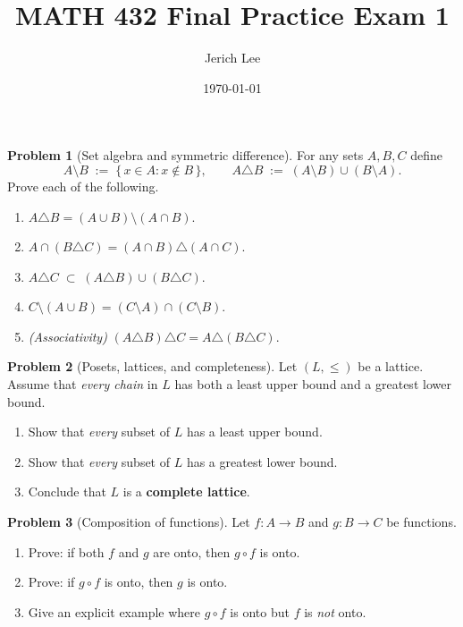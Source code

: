 \documentclass[12pt]{article}
\title{MATH 432 Final Practice Exam 1}
\author{Jerich Lee}
\date{\today}
\theoremstyle{definition} %
\newtheorem{problem}{Problem}
\theoremstyle{plain} %
\begin{document}
\maketitle



\begin{problem}[Set algebra and symmetric difference]
  For any sets $A,B,C$ define
  \[
      A\setminus B \;:=\; \{\,x\in A : x\notin B\,\},
      \qquad
      A\triangle B \;:=\;(A\setminus B)\cup(B\setminus A).
  \]
  Prove each of the following.
  \begin{enumerate}[label=(\alph*)]
    \item $A\triangle B=(A\cup B)\setminus(A\cap B)$.
    \item $A\cap(B\triangle C)=(A\cap B)\triangle(A\cap C)$.
    \item $A\triangle C\;\subset\;(A\triangle B)\cup(B\triangle C)$.
    \item $C\setminus(A\cup B)=(C\setminus A)\cap(C\setminus B)$.
    \item \emph{(Associativity)}\;
          $(A\triangle B)\triangle C
          =A\triangle(B\triangle C)$.
  \end{enumerate}
\end{problem}

\begin{problem}[Posets, lattices, and completeness]
  Let $(L,\le)$ be a lattice.  Assume that \emph{every chain} in $L$
  has both a least upper bound and a greatest lower bound.
  \begin{enumerate}[label=(\alph*)]
    \item Show that \emph{every} subset of $L$ has a least upper bound.
    \item Show that \emph{every} subset of $L$ has a greatest lower bound.
    \item Conclude that $L$ is a \textbf{complete lattice}.
  \end{enumerate}
\end{problem}

\begin{problem}[Composition of functions]
  Let $f:A\to B$ and $g:B\to C$ be functions.
  \begin{enumerate}[label=(\alph*)]
    \item Prove: if both $f$ and $g$ are onto, then $g\circ f$ is onto.
    \item Prove: if $g\circ f$ is onto, then $g$ is onto.
    \item Give an explicit example where $g\circ f$ is onto but $f$ is
          \emph{not} onto.
  \end{enumerate}
\end{problem}
\end{document}
